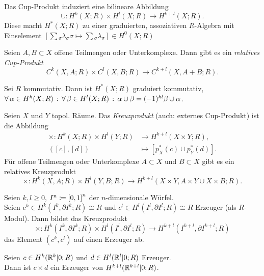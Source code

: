 \documentclass{cheat-sheet}
\begin{document}
\begin{kor}
  Das Cup-Produkt induziert eine bilineare Abbildung
  \[ \cup : H^k(X; R) \times H^l(X; R) \to H^{k+l}(X; R). \]
  Diese macht $H^*(X; R)$ zu einer graduierten, assoziativen $R$-Algebra mit Einselement $[\sum\!_\sigma \lambda_\sigma \sigma \mapsto \sum\!_\sigma \lambda_\sigma] \in H^0(X; R)$
\end{kor}

\begin{bem}
  Seien $A, B \subset X$ offene Teilmengen oder Unterkomplexe. Dann gibt es ein \emph{relatives Cup-Produkt}
  \[ C^k(X, A; R) \times C^l(X, B; R) \to C^{k+l}(X, A + B; R). \]
\end{bem}

\begin{satz}
  Sei $R$ kommutativ. Dann ist $H^*(X; R)$ graduiert kommutativ, \dh{}
  $\forall \, {\alpha \in H^k(X; R)} \,:\, \forall \, {\beta \in H^l(X; R)} \,:\, \alpha \cup \beta = (-1)^{kl} \beta \cup \alpha$.
\end{satz}

\begin{defn}
  Seien $X$ und $Y$ topol. Räume.
  Das \emph{Kreuzprodukt} (auch: externes Cup-Produkt) ist die Abbildung
  \begin{align*}
    \times : H^k(X; R) \times H^l(Y; R) & \to H^{k+l}(X \times Y; R), \\
    ([c], [d]) & \mapsto [p_X^*(c) \cup p_Y^*(d)].
  \end{align*}
  Für offene Teilmengen oder Unterkomplexe $A \subset X$ und $B \subset X$ gibt es ein relatives Kreuzprodukt
  \[ \times : H^k(X, A; R) \times H^l(Y, B; R) \to H^{k+l}(X \times Y, A \times Y \cup X \times B; R). \]
\end{defn}

\begin{satz}
  Seien $k, l \geq 0$, $I^n \coloneqq \left[ 0, 1 \right]^n$ der $n$-dimensionale Würfel. \\
  Seien $c^k \in H^k(I^k, \partial I^k; R) \cong R$ und $c^l \in H^l(I^l, \partial I^l; R) \cong R$ Erzeuger (als $R$-Modul). Dann bildet das Kreuzprodukt
  \[ \times : H^k(I^k, \partial I^k; R) \times H^l(I^l, \partial I^l; R) \to H^{k+l}(I^{k+l}, \partial I^{k+l}; R) \]
  das Element $(c^k, c^l)$ auf einen Erzeuger ab.
\end{satz}

\begin{satz}
  Seien $c \in H^k(\mathbb{R}^k|0; R)$ und $d \in H^l(\mathbb{R}^l|0; R)$ Erzeuger.\\
  Dann ist $c \times d$ ein Erzeuger von $H^{k+l}(\mathbb{R}^{k+l}|0; R)$.
\end{satz}
\end{document}
